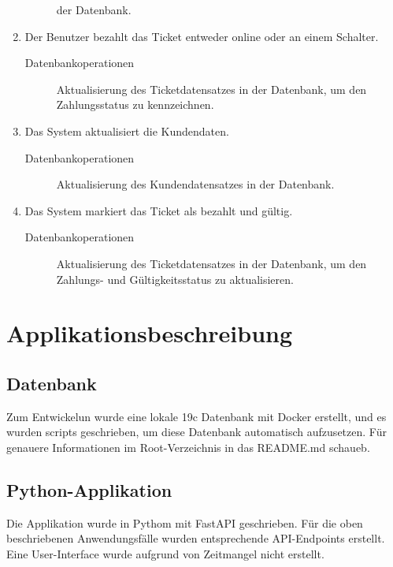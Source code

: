 \begin{enumerate}
\begin{description}
            der Datenbank.   
        \end{description}
    \item Der Benutzer bezahlt das Ticket entweder online oder an einem Schalter.
        \begin{description}
            \item[Datenbankoperationen] Aktualisierung des Ticketdatensatzes in der Datenbank,
            um den Zahlungsstatus zu kennzeichnen.                        
        \end{description}
    \item Das System aktualisiert die Kundendaten.
        \begin{description}
            \item[Datenbankoperationen] Aktualisierung des Kundendatensatzes in der
            Datenbank.                        
        \end{description}
    \item Das System markiert das Ticket als bezahlt und gültig.
        \begin{description}
            \item[Datenbankoperationen]  Aktualisierung des Ticketdatensatzes in der Datenbank,
            um den Zahlungs- und Gültigkeitsstatus zu aktualisieren.                                    
        \end{description}
\end{enumerate}


\section{Applikationsbeschreibung} \label{sec:app}
\subsection{Datenbank}
Zum Entwickelun wurde eine lokale 19c Datenbank mit Docker erstellt, und es wurden scripts geschrieben, um diese Datenbank automatisch aufzusetzen. 
Für genauere Informationen im Root-Verzeichnis in das README.md schaueb.

\subsection{Python-Applikation}
Die Applikation wurde in Pythom mit FastAPI geschrieben.
Für die oben beschriebenen Anwendungsfälle wurden entsprechende API-Endpoints erstellt.
Eine User-Interface wurde aufgrund von Zeitmangel nicht erstellt.

